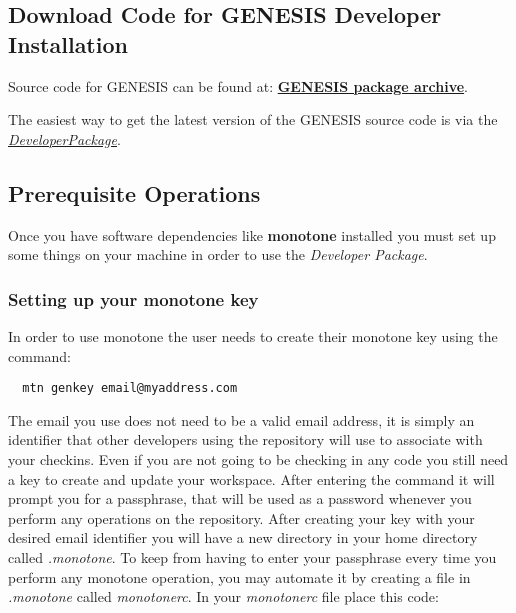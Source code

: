 \documentclass[12pt]{article}
\begin{document}
\subsection*{Download Code for GENESIS Developer Installation}

Source code for GENESIS can be found at: \href{http://repo-genesis3.cbi.utsa.edu/src/}{\bf GENESIS package archive}.

The easiest way to get the latest version of the GENESIS source code is via the  \href{../developer-package/developer-package.tex}{\it DeveloperPackage}.



\subsection*{Prerequisite Operations}

Once you have software dependencies like {\bf monotone} installed you must set up some things on your machine in order to use the {\it Developer Package}. 

\subsubsection*{Setting up your monotone key}

In order to use monotone the user needs to create their monotone key using the command:

\begin{verbatim}
  mtn genkey email@myaddress.com
\end{verbatim}

 The email you use does not need to be a valid email address, it is simply an identifier that other developers using the repository will use to associate with your checkins. Even if you are not going to be checking in any code you still need a key to create and update your workspace. After entering the command it will prompt you for a passphrase, that will be used as a password whenever you perform any operations on the repository.
 After creating your key with your desired email identifier you will have a new directory in your home directory called {\it .monotone}. To keep from having to enter your passphrase every time you perform any monotone operation, you may automate it by creating a file in {\it .monotone} called {\it monotonerc}. In your {\it monotonerc} file place this code:
 
\end{document}
